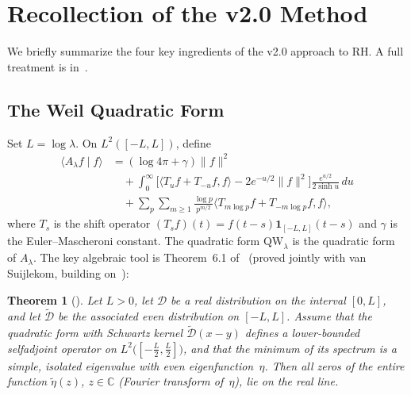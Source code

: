 \documentclass[12pt,a4paper]{article}
\newtheorem{theorem}{Theorem}[section]
\theoremstyle{definition}
\theoremstyle{remark}
\newcommand{\QW}{\mathrm{QW}}
\begin{document}
\section{Recollection of the v2.0 Method}
\label{sec:v2-recollect}

We briefly summarize the four key ingredients of the v2.0 approach to RH. A
full treatment is in~\cite{Geiger2026partII}.

\subsection{The Weil Quadratic Form}

Set $L = \log\lambda$. On $L^2([-L,L])$, define
\begin{equation}
\label{eq:QW-riemann}
\begin{split}
\langle A_\lambda f\mid f\rangle
&= (\log 4\pi + \gamma)\|f\|^2 \\
&\quad + \int_0^\infty \Big[\langle T_u f + T_{-u} f, f\rangle - 2e^{-u/2}\|f\|^2\Big]
\frac{e^{u/2}}{2\sinh u}\,du \\
&\quad + \sum_p\sum_{m\ge 1}\frac{\log p}{p^{m/2}}
\langle T_{m\log p} f + T_{-m\log p} f, f\rangle,
\end{split}
\end{equation}
where $T_s$ is the shift operator $(T_s f)(t) = f(t-s)\mathbf{1}_{[-L,L]}(t-s)$
and $\gamma$ is the Euler--Mascheroni constant. The quadratic form $\QW_\lambda$
is the quadratic form of $A_\lambda$.  The key algebraic tool is
Theorem~6.1 of~\cite{Connes2026} (proved jointly with van Suijlekom,
building on~\cite{ConnesMoscovici2022}):

\begin{theorem}[{\cite[Theorem~6.1]{Connes2026}}]
\label{thm:connes}
Let $L > 0$, let $\mathcal{D}$ be a real distribution on the interval
$[0,L]$, and let $\tilde{\mathcal{D}}$ be the associated even distribution
on $[-L,L]$.  Assume that the quadratic form with Schwartz kernel
$\tilde{\mathcal{D}}(x-y)$ defines a lower-bounded selfadjoint operator on
$L^2\!\bigl([-\tfrac{L}{2},\tfrac{L}{2}]\bigr)$, and that the minimum of its
spectrum is a simple, isolated eigenvalue with even eigenfunction~$\eta$.
Then all zeros of the entire function $\tilde\eta(z)$, $z\in\mathbb{C}$
(Fourier transform of\/~$\eta$), lie on the real line.
\end{theorem}
\end{document}
